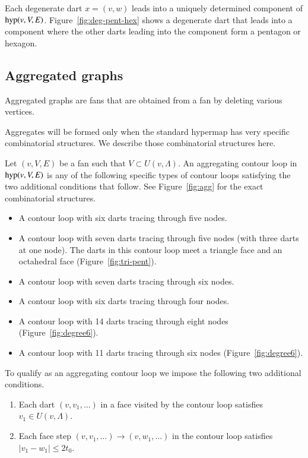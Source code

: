 Each degenerate dart $x=(v,w)$ leads into a uniquely determined
component of ${\operatorname{hyp}}(v,V,E)$.  
Figure~\ref{fig:deg-pent-hex} %
shows a degenerate dart that leads into a component where
the other darts leading into the component form a pentagon
or hexagon.


\subsection{Aggregated graphs}
\label{sec:stargraph}


Aggregated graphs are fans that are obtained from
a fan by deleting various vertices.  

Aggregates will be formed only when the standard hypermap has
very specific combinatorial structures.  We describe those
combinatorial structures here.

\begin{definition}
Let $(v,V,E)$ be a fan such that $V\subset U(v,\Lambda)$.
An aggregating contour loop in ${\operatorname{hyp}}(v,V,E)$ 
is any of the following specific
types of contour loops satisfying the 
two additional conditions that follow.
See Figure~\ref{fig:agg} %
for the exact combinatorial structures.
\begin{itemize}
\item A contour loop with six darts tracing through five nodes. 
\item A contour loop with seven darts tracing through five nodes (with three
  darts at one node).
   The darts in this contour loop
   meet a triangle face and an octahedral face (Figure~\ref{fig:tri-pent}). 
\item A contour loop with seven darts tracing through six nodes.
\item A contour loop with six darts tracing through four nodes. 
\item A contour loop with 14 darts tracing through eight nodes
   (Figure~\ref{fig:degree6}). %
\item A contour loop with 11 darts tracing through six nodes %
   (Figure~\ref{fig:degree6}).
\end{itemize}
To qualify as an aggregating 
contour loop we impose the following two additional conditions.
\begin{enumerate}
\item Each dart $(v,v_1,\ldots)$ in a face visited by the contour 
loop satisfies $v_1\in U(v,\Lambda)$.
\item Each face step $(v,v_1,\ldots)\to (v,w_1,\ldots)$ in the contour
loop satisfies $|v_1-w_1|\le 2t_0$.
\end{enumerate}
\end{definition}

